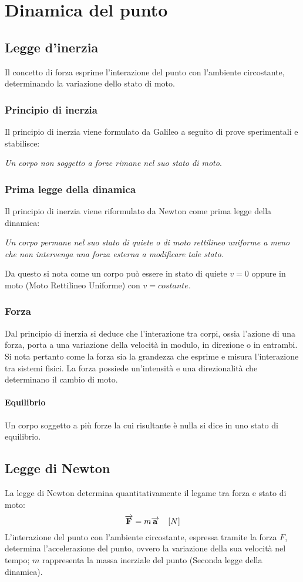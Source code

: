 \documentclass[class=book, crop=false, oneside, 12pt]{standalone}
\begin{document}
\chapter{Dinamica del punto}

\section{Legge d'inerzia}
Il concetto di forza esprime l'interazione del punto con l'ambiente circostante, determinando la variazione dello stato di moto.
\subsection{Principio di inerzia}
Il principio di inerzia viene formulato da Galileo a seguito di prove sperimentali e stabilisce:
\begin{center}
    \emph{Un corpo non soggetto a forze rimane nel suo stato di moto}.
\end{center}
\subsection{Prima legge della dinamica}
Il principio di inerzia viene riformulato da Newton come prima legge della dinamica:
\begin{center}
    \emph{Un corpo permane nel suo stato di quiete o di moto rettilineo uniforme a meno che non intervenga una forza esterna a modificare tale stato}.
\end{center}
Da questo si nota come un corpo può essere in stato di quiete \(v = 0\) oppure in moto (Moto Rettilineo Uniforme) con \(v = costante\).
\subsection{Forza}
Dal principio di inerzia si deduce che l'interazione tra corpi, ossia l'azione di una forza, porta a una variazione della velocità in modulo, in direzione o in entrambi.
Si nota pertanto come la forza sia la grandezza che esprime e misura l'interazione tra sistemi fisici.
La forza possiede un'intensit\`a e una direzionalit\`a che determinano il cambio di moto.
\subsubsection{Equilibrio}
Un corpo soggetto a pi\`u forze la cui risultante \`e nulla si dice in uno stato di equilibrio.
\section{Legge di Newton}
La legge di Newton determina quantitativamente il legame tra forza e stato di moto:
\begin{equation}
    \overrightarrow{F} = m \overrightarrow{a} \ \udm{N}
\end{equation}
L'interazione del punto con l'ambiente circostante, espressa tramite la forza \(F\), determina l'accelerazione del punto, ovvero la variazione della sua velocità nel tempo; \(m\) rappresenta la massa inerziale del punto (Seconda legge della dinamica).
\end{document}
